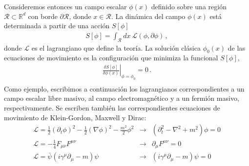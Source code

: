Consideremos entonces un campo escalar $\phi(x)$ definido sobre una región $\mathcal R\subset \mathbb{R}^d$ con borde $\partial \mathcal R$, donde $x \in  \mathcal R$. La dinámica del campo $\phi(x)$ está determinada a partir de una acción $S[\phi]$
\begin{align}
		S[\phi]=\int_\mathcal R dx\ \mathscr L(\phi,\partial\phi)\,,
\end{align}
 donde $\mathscr L$ es el lagrangiano que define la teoría. La solución clásica $\phi _0(x)$ de las ecuaciones de movimiento es la configuración que minimiza la funcional $S[\phi]$,
\begin{equation}
\begin{array}{c}
\left. \frac{\delta S [ \phi ] }{\delta \phi (x)}  \right| _{\phi = \phi _0  } = 0 \, . \\[10pt]
\end{array}
\end{equation}
Como ejemplo, escribimos a continuación los lagrangianos correspondientes a un campo escalar libre masivo, al campo electromagnético y a un fermión masivo, respectivamente. Se escriben también las correspondientes ecuaciones de movimiento de Klein-Gordon, Maxwell y Dirac:
\begin{equation}
\begin{array}{lcl}
\mathscr{L} = \frac{1}{2} (\partial _t \phi ) ^2 - \frac{1}{2} (  \nabla \phi ) ^2 - 
	\frac{m^2}{2} \phi ^2 
&\rightarrow& 
\left(
	\partial _t ^2 - \nabla ^2 + m^2 
		\right) \phi = 0 \\[8pt]
		
\mathscr{L} = - \frac{1}{4} F _{\mu \nu} F ^{\mu \nu}
&\rightarrow&
 \partial _{\mu} F ^{\mu \nu} = 0 \\[8pt]

\mathscr{L} =  { \bar{\psi} } \left(
			i \gamma ^{\mu} \partial _{\mu} - m 
			\right) \psi 
&\rightarrow&
			\left( i  \gamma ^{\mu} \partial _{\mu}  - m \right)\psi = 0\\[10pt]
\end{array}
\label{campos}
\end{equation}

